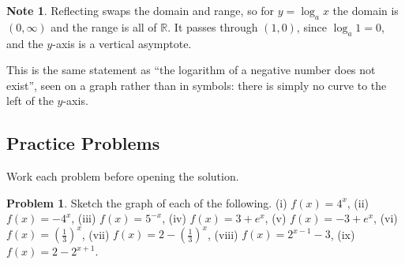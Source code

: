 \documentclass[11pt,a4paper]{article}
\theoremstyle{definition}
\newtheorem{note}[thm]{Note}
\newtheorem{problemx}{Problem}[section]
\newenvironment{problem}{\begin{problemx}}{\end{problemx}}
\begin{document}
\begin{note}
Reflecting swaps the domain and range, so for $y=\log_a x$ the domain is $(0,\infty)$
and the range is all of $\mathbb{R}$. It passes through $(1,0)$, since $\log_a 1=0$, and
the $y$-axis is a vertical asymptote.

This is the same statement as ``the logarithm of a negative number does not exist'',
seen on a graph rather than in symbols: there is simply no curve to the left of the
$y$-axis.
\end{note}


\subsection{Practice Problems}

Work each problem before opening the solution.

\begin{problem}
Sketch the graph of each of the following.
\quad (i) $f(x)=4^x$, \quad (ii) $f(x)=-4^x$, \quad (iii) $f(x)=5^{-x}$, \quad
(iv) $f(x)=3+e^x$, \quad (v) $f(x)=-3+e^x$, \quad
(vi) $f(x)=\left(\frac{1}{3}\right)^x$, \quad
(vii) $f(x)=2-\left(\frac{1}{3}\right)^x$, \quad (viii) $f(x)=2^{x-1}-3$, \quad
(ix) $f(x)=2-2^{x+1}$.
\end{problem}
\end{document}
